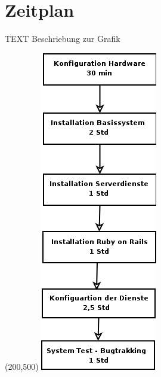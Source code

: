 \chapter{Zeitplan}  %
\label{chapter:Zeitplan}  %

TEXT Beschriebung zur Grafik

\begin{minipage}{250pt}
\begin{center}
	\begin{picture}(200,500)
	\includegraphics{../bilder/Zeitplaninstall.png}
	\end{picture}
\end{center}
\end{minipage}



